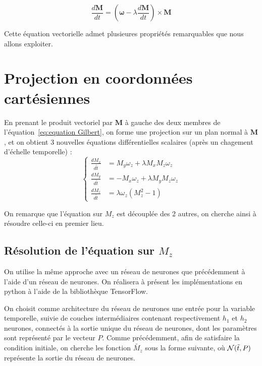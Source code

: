 \documentclass[12pt]{report}
\begin{document}
\begin{equation}
    \frac{d\bm{M}}{dt} = (\bm{\omega}-\lambda \frac{d{\bm{M}}}{dt})\times\bm{M} 
    \label{eq:equation Gilbert}
\end{equation}

Cette équation vectorielle admet plusieures propriétés remarquables que nous allons exploiter.

\section{Projection en coordonnées cartésiennes}
\label{sec:projection_cartesiennes}

En prenant le produit vectoriel par $\bm M$ à gauche des deux membres de l'équation~\ref{eq:equation Gilbert}, on forme une projection sur un plan normal à $\bm{M}$, et on obtient 3 nouvelles équations différentielles scalaires (après un chagement d'échelle temporelle) :
\begin{equation}
    \left\{
        \begin{aligned}
            \frac{dM_x}{d\tilde{t}} &= M_y\omega_z + \lambda M_x M_z \omega_z \\
            \frac{dM_y}{d\tilde{t}} &= -M_x\omega_z + \lambda M_y M_z \omega_z \\
            \frac{dM_z}{d\tilde{t}} &= \lambda\omega_z (M_z^2-1) 
        \end{aligned} 
    \right. 
    \label{eq:equations scalaires Gilbert}
\end{equation}

On remarque que l'équation sur $M_z$ est découplée des 2 autres, on cherche ainsi à résoudre
celle-ci en premier lieu.

\subsection{Résolution de l'équation sur $M_z$}


On utilise la même approche avec un réseau de neurones que précédemment à l'aide d'un réseau de neurones.
On réalisera à présent les implémentations en python à l'aide de la bibliothèque TensorFlow.


On choisit comme architecture du réseau de neurones une entrée pour la variable temporelle, 
suivie de couches intermédiaires contenant respectivement $h_1$ et $h_2$ neurones, connectés
à la sortie unique du réseau de neurones, dont les paramètres sont représenté par le vecteur $P$.
Comme précédemment, afin de satisfaire la condition initiale, on cherche les fonction $\tilde{M_z}$
sous la forme suivante, où ${\mathcal{N}}(\Tilde{t},P)$ représente la sortie du réseau de neurones.
\end{document}
